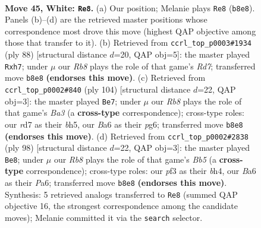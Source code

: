 \documentclass[11pt]{article}
\begin{document}
\clearpage

\begin{figure}[p]\centering
\begin{subfigure}{0.46\textwidth}\centering
\resizebox{\linewidth}{!}{%
\newchessgame
\chessboard[
  setfen={1R6/3r2k1/B7/8/4p2p/4Bp1P/b4P2/6K1 w - - 0 45},
  showmover=false,
  pgfstyle=straightmove, color=movearrow, markmove={b8-e8}
]}
\caption{}
\end{subfigure}\hfill
\begin{subfigure}{0.46\textwidth}\centering
\resizebox{\linewidth}{!}{%
\newchessgame
\chessboard[
  setfen={2r2k2/3R3p/5Bp1/p5P1/8/Pb6/8/K7 w - - 4 45},
  showmover=false,
  pgfstyle=straightmove, color=movearrow, markmove={d7-h7}
]}
\caption{}
\end{subfigure}
\\[4pt]
\begin{subfigure}{0.46\textwidth}\centering
\resizebox{\linewidth}{!}{%
\newchessgame
\chessboard[
  setfen={8/8/2k3p1/6Pb/p1p5/B7/1PPK4/8 w - - 2 53},
  showmover=false,
  pgfstyle=straightmove, color=movearrow, markmove={a3-e7}
]}
\caption{}
\end{subfigure}\hfill
\begin{subfigure}{0.46\textwidth}\centering
\resizebox{\linewidth}{!}{%
\newchessgame
\chessboard[
  setfen={8/p5p1/P6p/1B5P/3k1P1b/5K2/8/8 w - - 5 50},
  showmover=false,
  pgfstyle=straightmove, color=movearrow, markmove={b5-e8}
]}
\caption{}
\end{subfigure}
\caption{\textbf{Move 45, White: \texttt{Re8}.} (a) Our position; Melanie plays \texttt{Re8} (\texttt{b8e8}). Panels (b)--(d) are the retrieved master positions whose correspondence most drove this move (highest QAP objective among those that transfer to it). (b) Retrieved from \texttt{ccrl\_top\_p0003\#1934} (ply 88) [structural distance $d$=20, QAP obj=5]: the master played \texttt{Rxh7}; under $\mu$ our \emph{Rb8} plays the role of that game's \emph{Rd7}; transferred move \texttt{b8e8} \textbf{(endorses this move)}. (c) Retrieved from \texttt{ccrl\_top\_p0002\#840} (ply 104) [structural distance $d$=22, QAP obj=3]: the master played \texttt{Be7}; under $\mu$ our \emph{Rb8} plays the role of that game's \emph{Ba3} (a \textbf{cross-type} correspondence); cross-type roles: our \emph{r}d7 as their \emph{b}h5, our \emph{B}a6 as their \emph{p}g6; transferred move \texttt{b8e8} \textbf{(endorses this move)}. (d) Retrieved from \texttt{ccrl\_top\_p0002\#2838} (ply 98) [structural distance $d$=22, QAP obj=3]: the master played \texttt{Be8}; under $\mu$ our \emph{Rb8} plays the role of that game's \emph{Bb5} (a \textbf{cross-type} correspondence); cross-type roles: our \emph{p}f3 as their \emph{b}h4, our \emph{B}a6 as their \emph{P}a6; transferred move \texttt{b8e8} \textbf{(endorses this move)}. Synthesis: 5 retrieved analogs transferred to \texttt{Re8} (summed QAP objective 16, the strongest correspondence among the candidate moves); Melanie committed it via the \texttt{search} selector.}
\label{fig:thought-m88}
\end{figure}
\end{document}
